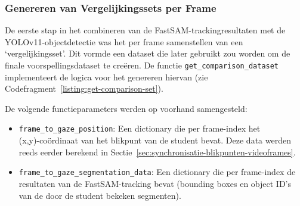 \subsubsection{Genereren van Vergelijkingssets per Frame}

De eerste stap in het combineren van de FastSAM-trackingresultaten met de\\ YOLOv11-objectdetectie was het per frame samenstellen van een `vergelijkingsset'.
Dit vormde een dataset die later gebruikt zou worden om de finale voorspellingsdataset te creëren.
De functie \texttt{get\_comparison\_dataset} implementeert de logica voor het genereren hiervan (zie Codefragment~\ref{listing:get-comparison-set}).

De volgende functieparameters werden op voorhand samengesteld:
\begin{itemize}
    \item \texttt{frame\_to\_gaze\_position}: Een dictionary die per frame-index het\\ (x,y)-coördinaat van het 
    blikpunt van de student bevat. 
    Deze data werden reeds eerder berekend in Sectie~\ref{sec:synchronisatie-blikpunten-videoframes}.
    \item \texttt{frame\_to\_gaze\_segmentation\_data}: Een dictionary 
    die per frame-index de resultaten van de FastSAM-tracking bevat (bounding boxes en object ID's van de door de student bekeken segmenten).
\end{itemize}


